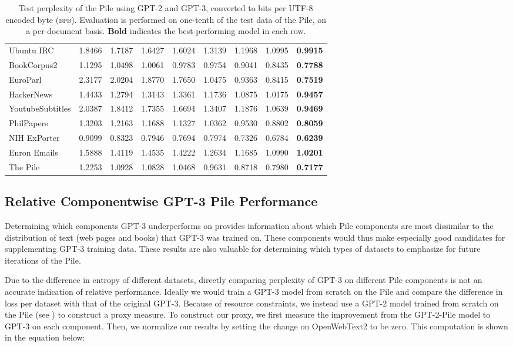 \documentclass[11pt,a4paper]{article}
\begin{document}
\begin{table*}[ht]
{\begin{tabular}{l rrrr rrrr}
    Ubuntu IRC & 1.8466 & 1.7187 & 1.6427 & 1.6024 & 1.3139 & 1.1968 & 1.0995 & \textbf{0.9915} \\
    BookCorpus2 & 1.1295 & 1.0498 & 1.0061 & 0.9783 & 0.9754 & 0.9041 & 0.8435 & \textbf{0.7788} \\
    EuroParl & 2.3177 & 2.0204 & 1.8770 & 1.7650 & 1.0475 & 0.9363 & 0.8415 & \textbf{0.7519} \\
    HackerNews & 1.4433 & 1.2794 & 1.3143 & 1.3361 & 1.1736 & 1.0875 & 1.0175 & \textbf{0.9457} \\
    YoutubeSubtitles & 2.0387 & 1.8412 & 1.7355 & 1.6694 & 1.3407 & 1.1876 & 1.0639 & \textbf{0.9469} \\
    PhilPapers & 1.3203 & 1.2163 & 1.1688 & 1.1327 & 1.0362 & 0.9530 & 0.8802 & \textbf{0.8059} \\
    NIH ExPorter & 0.9099 & 0.8323 & 0.7946 & 0.7694 & 0.7974 & 0.7326 & 0.6784 & \textbf{0.6239} \\
    Enron Emails & 1.5888 & 1.4119 & 1.4535 & 1.4222 & 1.2634 & 1.1685 & 1.0990 & \textbf{1.0201} \\
    \midrule
    The Pile & 1.2253 & 1.0928 & 1.0828 & 1.0468 & 0.9631 & 0.8718 & 0.7980 & \textbf{0.7177} \\
        \bottomrule
    \end{tabular}
}
\caption{Test perplexity of the Pile using GPT-2 and GPT-3, converted to bits per UTF-8 encoded byte (\textsc{bpb}). Evaluation is performed on one-tenth of the test data of the Pile, on a per-document basis. \textbf{Bold} indicates the best-performing model in each row.}
\label{table:pile_perplexity_utf8}
\end{table*}



\subsection{Relative Componentwise GPT-3 Pile Performance}\label{sec:entropy_adjusted}

Determining which components GPT-3 underperforms on provides information about which Pile components are most dissimilar to the distribution of text (web pages and books) that GPT-3 was trained on. These components would thus make especially good candidates for supplementing GPT-3 training data. These results are also valuable for determining which types of datasets to emphasize for future iterations of the Pile.

Due to the difference in entropy of different datasets, directly comparing perplexity of GPT-3 on different Pile components is not an accurate indication of relative performance. Ideally we would train a GPT-3 model from scratch on the Pile and compare the difference in loss per dataset with that of the original GPT-3. Because of resource constraints, we instead use a GPT-2 model trained from scratch on the Pile (see ) to construct a proxy measure. To construct our proxy, we first measure the improvement from the GPT-2-Pile model to GPT-3 on each component. Then, we normalize our results by setting the change on OpenWebText2 to be zero. This computation is shown in the equation below:
\end{document}
